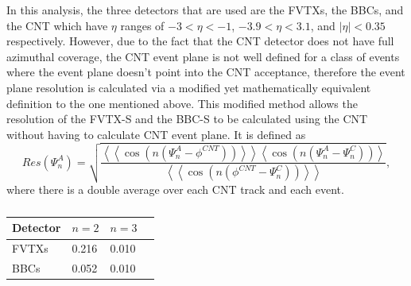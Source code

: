 In this analysis, the three detectors that are used are the FVTXs, the BBCs, and the CNT which have $\eta$ ranges of $-3 <\eta < -1$, $-3.9 < \eta < 3.1$, and $|\eta| < 0.35$ respectively. 
However, due to the fact that the CNT detector does not have full azimuthal coverage, the CNT event plane is not well defined for a class of events where the event plane doesn't point into the CNT acceptance, therefore the event plane resolution is calculated via a modified yet mathematically equivalent definition to the one mentioned above. This modified method allows the resolution of the FVTX-S and the BBC-S to be calculated using the CNT without having to calculate CNT event plane. It is defined as
\begin{equation}
Res(\Psi_n^A) = \sqrt{\frac{\left<\left<\cos(n(\Psi_n^A - \phi^{CNT}))\right>\right>\left<\cos(n(\Psi_n^A - \Psi_n^C))\right>}{\left<\left<\cos(n(\phi^{CNT} - \Psi_n^C))\right>\right>}},
\end{equation}
where there is a double average over each CNT track and each event.
\begin{table}[h!]
\caption{}
\begin{center}
    \begin{tabular}{| l | l | l | l |}
    \hline
    Detector & $n=2$ & $n=3$  \\ \hline
    FVTXs & 0.216 & 0.010 \\ \hline
    BBCs & 0.052 & 0.010  \\ \hline
    \end{tabular}
\end{center}
\end{table}

